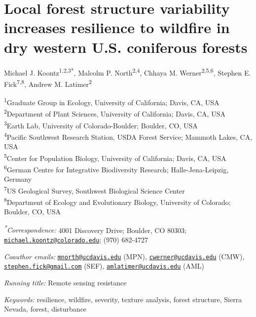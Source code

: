 \documentclass[]{article}
\title{}
\author{}
\date{}
\begin{document}
\hypertarget{local-forest-structure-variability-increases-resilience-to-wildfire-in-dry-western-u.s.-coniferous-forests}{%
\section{Local forest structure variability increases resilience to
wildfire in dry western U.S. coniferous
forests}\label{local-forest-structure-variability-increases-resilience-to-wildfire-in-dry-western-u.s.-coniferous-forests}}

Michael J. Koontz\textsuperscript{1,2,3*}, Malcolm P.
North\textsuperscript{2,4}, Chhaya M. Werner\textsuperscript{2,5,6},
Stephen E. Fick\textsuperscript{7,8}, Andrew M.
Latimer\textsuperscript{2}

\textsuperscript{1}Graduate Group in Ecology, University of California;
Davis, CA, USA\\
\textsuperscript{2}Department of Plant Sciences, University of
California; Davis, CA, USA\\
\textsuperscript{3}Earth Lab, University of Colorado-Boulder; Boulder,
CO, USA\\
\textsuperscript{4}Pacific Southwest Research Station, USDA Forest
Service; Mammoth Lakes, CA, USA\\
\textsuperscript{5}Center for Population Biology, University of
California; Davis, CA, USA\\
\textsuperscript{6}German Centre for Integrative Biodiversity Research;
Halle-Jena-Leipzig, Germany\\
\textsuperscript{7}US Geological Survey, Southwest Biological Science
Center\\
\textsuperscript{8}Department of Ecology and Evolutionary Biology,
University of Colorado; Boulder, CO, USA

\emph{\textsuperscript{*}Correspondence:} 4001 Discovery Drive; Boulder,
CO 80303;
\href{mailto:michael.koontz@colorado.edu}{\nolinkurl{michael.koontz@colorado.edu}};
(970) 682-4727

\emph{Coauthor emails:}
\href{mailto:mnorth@ucdavis.edu}{\nolinkurl{mnorth@ucdavis.edu}} (MPN),
\href{mailto:cwerner@ucdavis.edu}{\nolinkurl{cwerner@ucdavis.edu}}
(CMW),
\href{mailto:stephen.fick@gmail.com}{\nolinkurl{stephen.fick@gmail.com}}
(SEF),
\href{mailto:amlatimer@ucdavis.edu}{\nolinkurl{amlatimer@ucdavis.edu}}
(AML)

\emph{Running title:} Remote sensing resistance

\emph{Keywords:} resilience, wildfire, severity, texture analysis,
forest structure, Sierra Nevada, forest, disturbance
\end{document}
